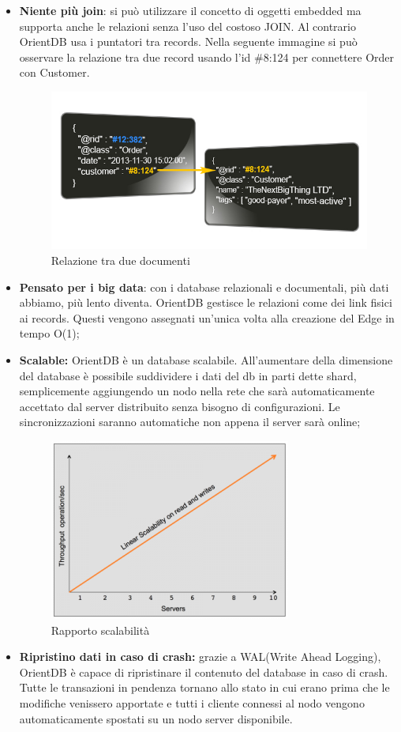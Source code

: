 \begin{itemize}
	\item \textbf{Niente più join}: si può utilizzare il concetto di oggetti embedded ma supporta anche le relazioni senza l'uso del costoso JOIN. Al contrario OrientDB usa i puntatori tra records. Nella seguente immagine si può osservare la relazione tra due record usando l'id \#8:124 per connettere Order con Customer.
	\begin{figure}[h]
	\centering
	\includegraphics[width=0.7\linewidth]{immagini/json_linked3}
	\caption[Relazione tra due documenti]{Relazione tra due documenti}
	\label{fig:json_linked3}
	\end{figure}
	
	\newpage
\item \textbf{Pensato per i big data}: con i database relazionali e documentali, più dati abbiamo, più lento diventa. OrientDB gestisce le relazioni come dei link fisici ai records. Questi vengono assegnati un'unica volta alla creazione del Edge in tempo O(1);
\item \textbf{Scalable:} OrientDB è un database scalabile. All'aumentare della dimensione del database è possibile suddividere i dati del db in parti dette shard, semplicemente aggiungendo un nodo nella rete che sarà automaticamente accettato dal server distribuito senza bisogno di configurazioni. Le sincronizzazioni saranno automatiche non appena il server sarà online;
\begin{figure}[h]
\centering
\includegraphics[width=0.7\linewidth]{immagini/scalability}
\caption[Rapporto scalabilità]{Rapporto scalabilità}
\label{fig:scalability}
\end{figure}

\item \textbf{Ripristino dati in caso di crash:} grazie a WAL(Write Ahead Logging), OrientDB è capace di ripristinare il contenuto del database in caso di crash. Tutte le transazioni in pendenza tornano allo stato in cui erano prima che le modifiche venissero apportate e tutti i cliente connessi al nodo vengono automaticamente spostati su un nodo server disponibile.
\end{itemize}
